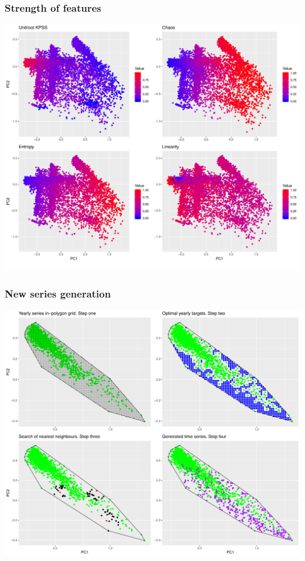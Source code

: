 \begin{frame}
\frametitle{Strength of features}

\begin{center}
\includegraphics[width = 0.8\linewidth]{slides/fin_str.pdf}
\end{center}
\end{frame}




\begin{frame}
\frametitle{New series generation}

\begin{center}
\includegraphics[width = 0.8\linewidth]{slides/generation_grid.pdf}
\end{center}
\end{frame}

